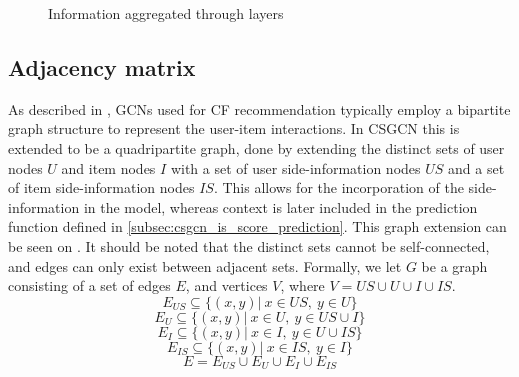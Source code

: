 \begin{figure}[h]

\caption{Information aggregated through layers}
\label{fig:aggregation-for-layers}
\end{figure}

\subsection{Adjacency matrix}\label{subsec:csgcn_is_adj_mat}
As described in , GCNs used for CF recommendation typically employ a bipartite graph structure to represent the user-item interactions.
In CSGCN this is extended to be a quadripartite graph, done by extending the distinct sets of user nodes $U$ and item nodes $I$ with a set of user side-information nodes $US$ and a set of item side-information nodes $IS$.
This allows for the incorporation of the side-information in the model, whereas context is later included in the prediction function defined in \autoref{subsec:csgcn_is_score_prediction}.
This graph extension can be seen on .
It should be noted that the distinct sets cannot be self-connected, and edges can only exist between adjacent sets.
Formally, we let $G$ be a graph consisting of a set of edges $E$, and vertices $V$, where $V = US \cup U \cup I \cup IS$.
$$E_{US} \subseteq \{ (x,y) | \: x \in US, \: y \in U  \}$$
$$E_U \subseteq \{ (x,y) | \: x \in U, \: y \in US \cup I \}$$
$$E_I \subseteq \{ (x,y) | \: x \in I, \: y \in U \cup IS \}$$
$$E_{IS} \subseteq \{ (x,y) | \: x \in IS, \: y \in I  \}$$
$$E = E_{US} \cup E_{U} \cup E_{I} \cup E_{IS} $$

